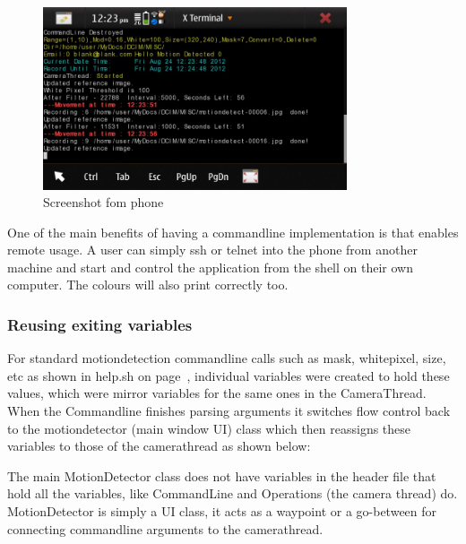 \documentclass[11pt]{article} %
\begin{document}
{\begin{figure}[H]
	\vspace{-10pt}
	\begin{center}
		\includegraphics[width=0.8\textwidth]{../images/commandline/commandscreen.jpg}
	\end{center}
	\vspace{-20pt}
	\caption{Screenshot fom phone}
	\label{img:command}
	\vspace{-10pt}
\end{figure}

One of the main benefits of having a commandline implementation is that enables remote usage. A user can simply ssh or telnet into the phone from another machine and start and control the application from the shell on their own computer. The colours will also print correctly too.

}
\subsubsection{Reusing exiting variables}

For standard motiondetection commandline calls such as mask, whitepixel, size, etc as shown in help.sh on page~\pageref{frame:help}, individual variables were created to hold these values, which were mirror variables for the same ones in the CameraThread. When the Commandline finishes parsing arguments it switches flow control back to the motiondetector (main window UI) class which then reassigns these variables to those of the camerathread as shown below:
\begin{frame}[fragile]

\end{frame}
The main MotionDetector class does not have variables in the header file that hold all the variables, like CommandLine and Operations (the camera thread) do. MotionDetector is simply a UI class, it acts as a waypoint or a go-between for connecting commandline arguments to the camerathread.
\end{document}
